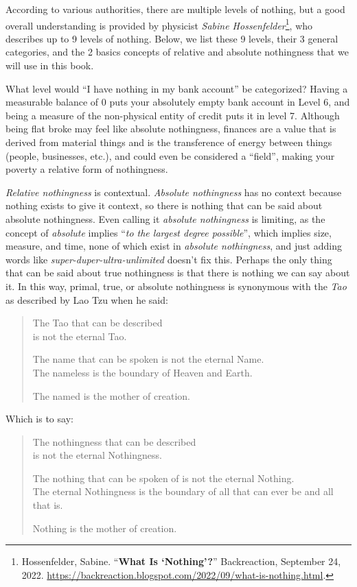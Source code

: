\documentclass[
]{article}
\begin{document}
According to various authorities, there are multiple levels of nothing,
but a good overall understanding is provided by physicist \emph{Sabine
Hossenfelder}\footnote{Hossenfelder, Sabine. ``\textbf{What Is
  `Nothing'?}'' Backreaction, September 24, 2022.
  \url{https://backreaction.blogspot.com/2022/09/what-is-nothing.html}.},
who describes up to 9 levels of nothing. Below, we list these 9 levels,
their 3 general categories, and the 2 basics concepts of relative and
absolute nothingness that we will use in this book.

What level would ``I have nothing in my bank account'' be categorized?
Having a measurable balance of 0 puts your absolutely empty bank account
in Level 6, and being a measure of the non-physical entity of credit
puts it in level 7. Although being flat broke may feel like absolute
nothingness, finances are a value that is derived from material things
and is the transference of energy between things (people, businesses,
etc.), and could even be considered a ``field'', making your poverty a
relative form of nothingness.

\emph{Relative nothingness} is contextual. \emph{Absolute nothingness}
has no context because nothing exists to give it context, so there is
nothing that can be said about absolute nothingness. Even calling it
\emph{absolute nothingness} is limiting, as the concept of
\emph{absolute} implies ``\emph{to the largest degree possible}'', which
implies size, measure, and time, none of which exist in \emph{absolute
nothingness}, and just adding words like
\emph{super-duper-ultra-unlimited} doesn't fix this. Perhaps the only
thing that can be said about true nothingness is that there is nothing
we can say about it. In this way, primal, true, or absolute nothingness
is synonymous with the \emph{Tao} as described by Lao Tzu when he said:

\begin{quote}
The Tao that can be described \\
is not the eternal Tao.

The name that can be spoken is not the eternal Name. \\
The nameless is the boundary of Heaven and Earth.

The named is the mother of creation.
\end{quote}

Which is to say:

\begin{quote}
The nothingness that can be described \\
is not the eternal Nothingness.

The nothing that can be spoken of is not the eternal Nothing. \\
The eternal Nothingness is the boundary of all that can ever be and all
that is.

Nothing is the mother of creation.
\end{quote}
\end{document}
